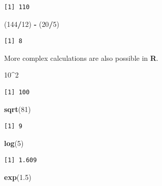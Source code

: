 \documentclass[]{book}
\newenvironment{Shaded}{\begin{snugshade}}{\end{snugshade}}
\newcommand{\DecValTok}[1]{\textcolor[rgb]{0.00,0.00,0.81}{#1}}
\newcommand{\FloatTok}[1]{\textcolor[rgb]{0.00,0.00,0.81}{#1}}
\newcommand{\KeywordTok}[1]{\textcolor[rgb]{0.13,0.29,0.53}{\textbf{#1}}}
\newcommand{\NormalTok}[1]{#1}
\newcommand{\OperatorTok}[1]{\textcolor[rgb]{0.81,0.36,0.00}{\textbf{#1}}}
\newcommand{\StringTok}[1]{\textcolor[rgb]{0.31,0.60,0.02}{#1}}
\begin{document}
\begin{verbatim}
[1] 110
\end{verbatim}

\begin{Shaded}
\begin{Highlighting}[]
\NormalTok{(}\DecValTok{144}\OperatorTok{/}\DecValTok{12}\NormalTok{) }\OperatorTok{-}\StringTok{ }\NormalTok{(}\DecValTok{20}\OperatorTok{/}\DecValTok{5}\NormalTok{)}
\end{Highlighting}
\end{Shaded}

\begin{verbatim}
[1] 8
\end{verbatim}

More complex calculations are also possible in \textbf{R}.

\begin{Shaded}
\begin{Highlighting}[]
\DecValTok{10}\OperatorTok{^}\DecValTok{2}
\end{Highlighting}
\end{Shaded}

\begin{verbatim}
[1] 100
\end{verbatim}

\begin{Shaded}
\begin{Highlighting}[]
\KeywordTok{sqrt}\NormalTok{(}\DecValTok{81}\NormalTok{)}
\end{Highlighting}
\end{Shaded}

\begin{verbatim}
[1] 9
\end{verbatim}

\begin{Shaded}
\begin{Highlighting}[]
\KeywordTok{log}\NormalTok{(}\DecValTok{5}\NormalTok{)}
\end{Highlighting}
\end{Shaded}

\begin{verbatim}
[1] 1.609
\end{verbatim}

\begin{Shaded}
\begin{Highlighting}[]
\KeywordTok{exp}\NormalTok{(}\FloatTok{1.5}\NormalTok{)}
\end{Highlighting}
\end{Shaded}
\end{document}
